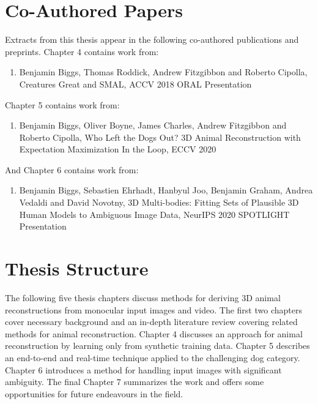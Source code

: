 \section{Co-Authored Papers}  %

Extracts from this thesis appear in the following co-authored publications and preprints. Chapter 4 contains work from:

\begin{enumerate}
    \item Benjamin Biggs, Thomas Roddick, Andrew Fitzgibbon and Roberto Cipolla, Creatures Great and SMAL, ACCV 2018 ORAL Presentation
\end{enumerate}

Chapter 5 contains work from:

\begin{enumerate}
    \item Benjamin Biggs, Oliver Boyne, James Charles, Andrew Fitzgibbon and Roberto Cipolla, Who Left the Dogs Out? 3D Animal Reconstruction with Expectation Maximization In the Loop, ECCV 2020
\end{enumerate}

And Chapter 6 contains work from:

\begin{enumerate}
    \item Benjamin Biggs, Sebastien Ehrhadt, Hanbyul Joo, Benjamin Graham, Andrea Vedaldi and David Novotny, 3D Multi-bodies: Fitting Sets of Plausible 3D Human Models to Ambiguous Image Data, NeurIPS 2020 SPOTLIGHT Presentation
\end{enumerate}

\section{Thesis Structure}  %

The following five thesis chapters discuss methods for deriving 3D animal reconstructions from monocular input images and video. The first two chapters cover necessary background and an in-depth literature review covering related methods for animal reconstruction. Chapter 4 discusses an approach for animal reconstruction by learning only from synthetic training data. Chapter 5 describes an end-to-end and real-time technique applied to the challenging dog category. Chapter 6 introduces a method for handling input images with significant ambiguity. The final Chapter 7 summarizes the work and offers some opportunities for future endeavours in the field.